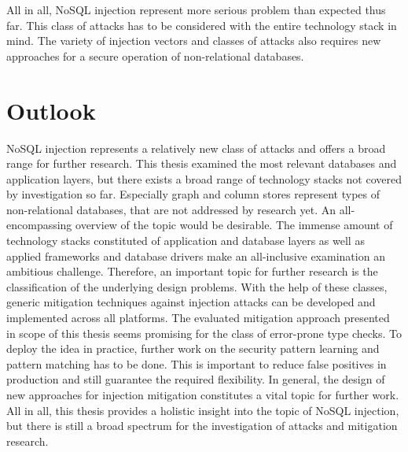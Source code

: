 All in all, NoSQL injection represent more serious problem than expected thus far. This class of attacks has to be considered with the entire technology stack in mind. The variety of injection vectors and classes of attacks also requires new approaches for a secure operation of non-relational databases. 

\section{Outlook}
NoSQL injection represents a relatively new class of attacks and offers a broad range for further research. This thesis examined the most relevant databases and application layers, but there exists a broad range of technology stacks not covered by investigation so far. Especially graph and column stores represent types of non-relational databases, that are not addressed by research yet. An all-encompassing overview of the topic would be desirable. The immense amount of technology stacks constituted of application and database layers as well as applied frameworks and database drivers make an all-inclusive examination an ambitious challenge. Therefore, an important topic for further research is the classification of the underlying design problems. With the help of these classes, generic mitigation techniques against injection attacks can be developed and implemented across all platforms. The evaluated mitigation approach presented in scope of this thesis seems promising for the class of error-prone type checks. To deploy the idea in practice, further work on the security pattern learning and pattern matching has to be done. This is important to reduce false positives in production and still guarantee the required flexibility. In general, the design of new approaches for injection mitigation constitutes a vital topic for further work. All in all, this thesis provides a holistic insight into the topic of NoSQL injection, but there is still a broad spectrum for the investigation of attacks and mitigation research. 